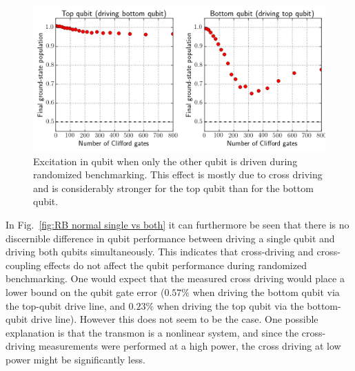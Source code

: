         \begin{figure}[tb]
          \centering
          \includegraphics[width=\textwidth]{Figures/Randomized benchmarking/RB_normal_cross-driving.png}
          \caption{Excitation in qubit when only the other qubit is driven during randomized benchmarking. This effect is mostly due to cross driving and is considerably stronger for the top qubit than for the bottom qubit.}
          \label{fig:RB normal cross-driving}
        \end{figure}

        In Fig.~\ref{fig:RB normal single vs both} it can furthermore be seen that there is no discernible difference in qubit performance between driving a single qubit and driving both qubits simultaneously. This indicates that cross-driving and cross-coupling effects do not affect the qubit performance during randomized benchmarking. One would expect that the measured cross driving would place a lower bound on the qubit gate error ($0.57\%$ when driving the bottom qubit via the top-qubit drive line, and $0.23\%$ when driving the top qubit via the bottom-qubit drive line). However this does not seem to be the case. One possible explanation is that the transmon is a nonlinear system, and since the cross-driving measurements were performed at a high power, the cross driving at low power might be significantly less.

